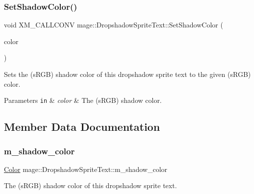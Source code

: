 \subsubsection{\texorpdfstring{Set\+Shadow\+Color()}{SetShadowColor()}\hspace{0.1cm}{\footnotesize\ttfamily [3/3]}}
{\footnotesize\ttfamily void X\+M\+\_\+\+C\+A\+L\+L\+C\+O\+NV mage\+::\+Dropshadow\+Sprite\+Text\+::\+Set\+Shadow\+Color (\begin{DoxyParamCaption}\item[{F\+X\+M\+V\+E\+C\+T\+OR}]{color }\end{DoxyParamCaption})\hspace{0.3cm}{\ttfamily [noexcept]}}

Sets the (s\+R\+GB) shadow color of this dropshadow sprite text to the given (s\+R\+GB) color.


\begin{DoxyParams}[1]{Parameters}
\mbox{\tt in}  & {\em color} & The (s\+R\+GB) shadow color. \\
\hline
\end{DoxyParams}


\subsection{Member Data Documentation}
\hypertarget{classmage_1_1_dropshadow_sprite_text_a6343fd2b2b2139d8a869c29a2a33531f}{}\label{classmage_1_1_dropshadow_sprite_text_a6343fd2b2b2139d8a869c29a2a33531f} 
\subsubsection{\texorpdfstring{m\+\_\+shadow\+\_\+color}{m\_shadow\_color}}
{\footnotesize\ttfamily \hyperlink{structmage_1_1_color}{Color} mage\+::\+Dropshadow\+Sprite\+Text\+::m\+\_\+shadow\+\_\+color\hspace{0.3cm}{\ttfamily [private]}}

The (s\+R\+GB) shadow color of this dropshadow sprite text. 